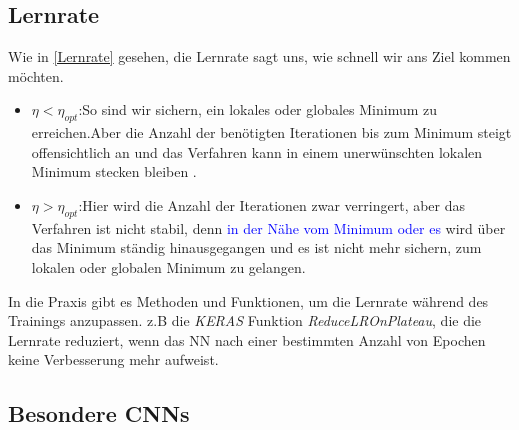\documentclass[12pt,a4paper]{scrartcl}
\numberwithin{equation}{section}
\begin{document}
\subsection{Lernrate}\label{Experiment:Lernrate}
Wie in \ref{Lernrate} gesehen, die Lernrate sagt uns, wie schnell wir ans Ziel kommen möchten.
\begin{itemize}
	\item $ \eta < \eta_{opt} $:So sind wir sichern, ein lokales oder globales Minimum zu erreichen.Aber die Anzahl der benötigten Iterationen bis zum Minimum steigt offensichtlich an und das Verfahren kann in einem unerwünschten lokalen Minimum stecken bleiben .
	\item $ \eta > \eta_{opt} $:Hier wird die Anzahl der Iterationen zwar verringert, aber das Verfahren ist nicht stabil, denn \textcolor{blue}{in der Nähe vom Minimum oder es} wird über das Minimum ständig hinausgegangen und es ist nicht mehr sichern, zum lokalen oder globalen Minimum zu gelangen.
\end{itemize}
In die Praxis gibt es Methoden und Funktionen, um die Lernrate während des Trainings anzupassen. z.B die \textit{KERAS} Funktion \textit{ReduceLROnPlateau}, die die Lernrate reduziert, wenn das \ac{NN} nach einer bestimmten Anzahl von Epochen keine Verbesserung mehr aufweist.



\subsection{Besondere \acsp{CNN}}
\end{document}
